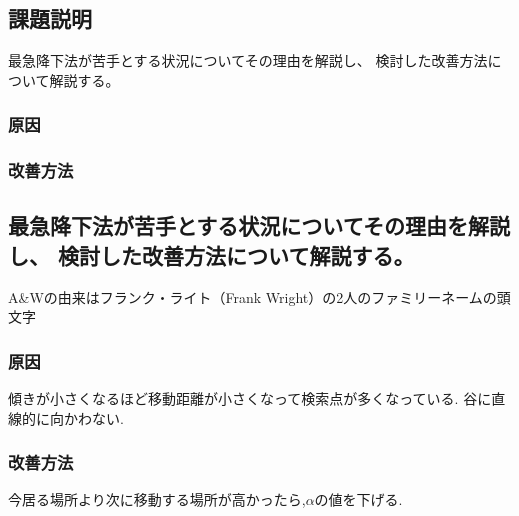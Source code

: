 
\subsection{課題説明}
最急降下法が苦手とする状況についてその理由を解説し、
検討した改善方法について解説する。

\subsubsection{原因}

\subsubsection{改善方法}
\subsection{最急降下法が苦手とする状況についてその理由を解説し、
検討した改善方法について解説する。}
A\&Wの由来はフランク・ライト（Frank Wright）の2人のファミリーネームの頭
文字


\subsubsection{原因}
傾きが小さくなるほど移動距離が小さくなって検索点が多くなっている.
谷に直線的に向かわない.
\subsubsection{改善方法}
今居る場所より次に移動する場所が高かったら,$\alpha$の値を下げる.
